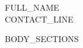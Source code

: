 \documentclass[a4paper,11pt]{article}
\begin{document}
\begin{center}
    {\Huge \scshape {{FULL_NAME}}} \\[3pt]
    \small {{CONTACT_LINE}}
\end{center}

\vspace{-4pt}

{{BODY_SECTIONS}}
\end{document}
